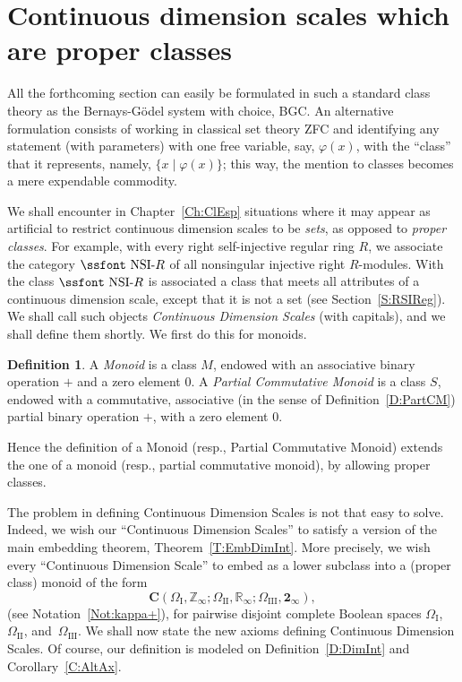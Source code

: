 \documentclass[psamsfonts,reqno]{memo-l}
\theoremstyle{plain}
\theoremstyle{definition}
\newtheorem{definition}[lemma]{Definition}
\theoremstyle{remark}
\numberwithin{equation}{section}
\newcommand{\two}{\mathbf{2}}
\newcommand{\Cn}{\mathbf{2}_{\infty}}
\newcommand{\Zn}{\mathbb{Z}_{\infty}}
\newcommand{\Rn}{\mathbb{R}_{\infty}}
\newcommand{\CC}{\mathbf{C}}
\newcommand{\I}{\mathrm{I}}
\newcommand{\II}{\mathrm{II}}
\newcommand{\III}{\mathrm{III}}
\newcommand{\ZZ}{\mathbb{Z}}
\newcommand{\RR}{\mathbb{R}}
\newcommand{\pcm}{partial commutative mon\-oid}
\newcommand{\PCM}{Partial Commutative Mon\-oid}
\newcommand{\set}[1]{\{#1\}}
\newcommand{\setm}[2]{\set{#1\mid#2}}
\newcommand{\NSIR}{\mbox{\ssfont NSI-}R}
\begin{document}
\section{Continuous dimension scales which are proper
classes}\label{S:PperClDI}
All the forthcoming section can
easily be formulated in such a standard class theory as the Bernays-G\"odel
system with choice, BGC. An alternative formulation consists of working in
classical set theory ZFC and identifying any statement (with parameters) with
one free variable, say, $\varphi(x)$, with the ``class'' that it
represents, namely, $\setm{x}{\varphi(x)}$; this way, the mention to classes
becomes a mere expendable commodity.

We shall encounter in Chapter~\ref{Ch:ClEsp} situations where it may
appear as artificial to restrict continuous dimension scales to be \emph{sets},
as opposed to \emph{proper classes}.
For example, with every right
self-injective regular ring $R$,
%
we associate the category $\NSIR$\index{NzzSIR@$\NSIR$|ii}
of all nonsingular injective right $R$-modules. With the class
$\NSIR$ is associated a class that meets all attributes of a
continuous dimension scale, except that it is not a set (see Section~\ref{S:RSIReg}).
We shall call such objects \emph{Continuous Dimension Scales} (with
capitals), and we shall define them shortly. We first do this for monoids.

\begin{definition}\label{D:Monoid}
A \emph{Monoid}
is a class $M$, endowed with an associative
binary operation $+$ and a zero element $0$. A \emph{\PCM}
is a class $S$,
endowed with a commutative, associative (in the sense of
Definition~\ref{D:PartCM}) partial binary operation $+$, with a zero
element $0$.
\end{definition}

Hence the definition of a Monoid (resp., \PCM) extends the one
of a monoid (resp., \pcm), by allowing proper classes.

The problem in defining Continuous Dimension Scales is not that easy to
solve. Indeed, we wish our ``Continuous Dimension Scales'' to satisfy a
version of the main embedding theorem, Theorem~\ref{T:EmbDimInt}. More
precisely, we wish every ``Continuous Dimension Scale'' to embed as a
lower subclass into a (proper class) monoid of the form
\index{Zzzinfty@$\ZZ_\infty$}\index{Rzzinfty@$\RR_\infty$}%
\index{Tzzinfty@$\two_\infty$}%
   \begin{equation}\label{Eq:InfSpace}
   \CC(\Omega_{\I},\Zn;\Omega_{\II},\Rn;\Omega_{\III},\Cn),
   \end{equation}
(see Notation~\ref{Not:kappa+}),
for pairwise disjoint complete Boolean
spaces $\Omega_{\I}$, $\Omega_{\II}$,
and~$\Omega_{\III}$. We shall now state the new axioms defining
Continuous Dimension Scales. Of course, our definition is modeled on
Definition~\ref{D:DimInt} and Corollary~\ref{C:AltAx}.
\end{document}
